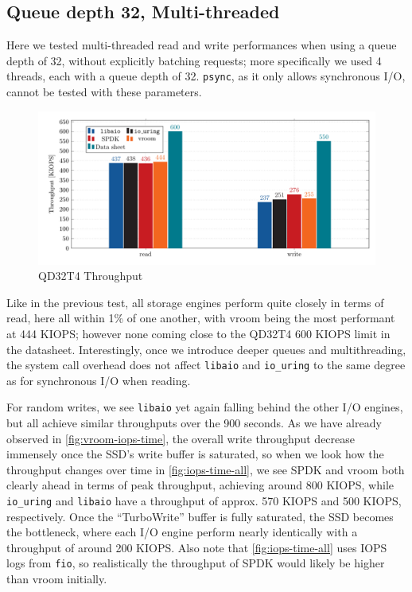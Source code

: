 \subsection{Queue depth 32, Multi-threaded}
Here we tested multi-threaded read and write performances when using a queue depth of 32, without explicitly batching requests; more specifically we used 4 threads, each with a queue depth of 32. \texttt{psync}, as it only allows synchronous I/O, cannot be tested with these parameters.

\begin{figure}
  \centering
    \includegraphics[width=\textwidth]{figures/iops-qd32-ybar}
    \caption{QD32T4 Throughput}
    \label{fig:iops-qd32}
\end{figure}

Like in the previous test, all storage engines perform quite closely in terms of read, here all within 1\% of one another, with vroom being the most performant at 444 KIOPS; however none coming close to the QD32T4 600 KIOPS limit in the datasheet. Interestingly, once we introduce deeper queues and multithreading, the system call overhead does not affect \texttt{libaio} and \texttt{io\_uring} to the same degree as for synchronous I/O when reading.

For random writes, we see \texttt{libaio} yet again falling behind the other I/O engines, but all achieve similar throughputs over the 900 seconds. As we have already observed in \autoref{fig:vroom-iops-time}, the overall write throughput decrease immensely once the SSD's write buffer is saturated, so when we look how the throughput changes over time in \autoref{fig:iops-time-all}, we see SPDK and vroom both clearly ahead in terms of peak throughput, achieving around 800 KIOPS, while \texttt{io\_uring} and \texttt{libaio} have a throughput of approx. 570 KIOPS and 500 KIOPS, respectively. Once the ``TurboWrite'' buffer is fully saturated, the SSD becomes the bottleneck, where each I/O engine perform nearly identically with a throughput of around 200 KIOPS. Also note that \autoref{fig:iops-time-all} uses IOPS logs from \texttt{fio}, so realistically the throughput of SPDK would likely be higher than vroom initially.

